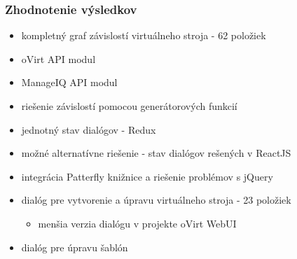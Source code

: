 \documentclass[pdf]{beamer}
\begin{document}
\begin{frame}
\frametitle{Zhodnotenie výsledkov}

\begin{itemize}
\item kompletný graf závislostí virtuálneho stroja - 62 položiek
\item oVirt API modul
\item ManageIQ API modul
\item riešenie závislostí pomocou generátorových funkcií
\item jednotný stav dialógov - Redux
\item možné alternatívne riešenie - stav dialógov rešených v ReactJS
\item integrácia Patterfly knižnice a riešenie problémov s jQuery
\item dialóg pre vytvorenie a úpravu virtuálneho stroja - 23 položiek
\begin{itemize}
\item menšia verzia dialógu v projekte oVirt WebUI
\end{itemize}
\item dialóg pre úpravu šablón
\end{itemize}

\end{frame}
\end{document}
